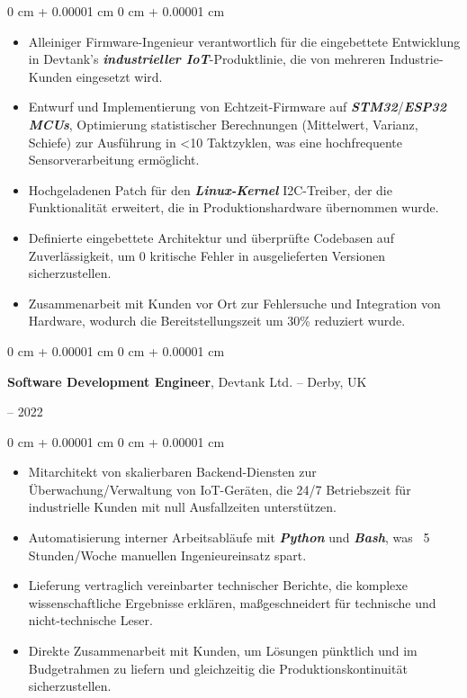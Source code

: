 \documentclass[10pt, letterpaper]{article}
\newenvironment{highlights}{
    \begin{itemize}[
        topsep=0.2 cm,
        parsep=0.2 cm,
        partopsep=0pt,
        itemsep=0.025 cm,
        leftmargin=0 cm + 10pt
    ]
}{
    \end{itemize}
}
\newenvironment{onecolentry}{
    \begin{adjustwidth}{
        0 cm + 0.00001 cm
    }{
        0 cm + 0.00001 cm
    }
}{
    \end{adjustwidth}
}
\newenvironment{twocolentry}[2][]{
    \onecolentry
    \def\secondColumn{#2}
    \setcolumnwidth{\fill, 4.75 cm}
    \begin{paracol}{2}
}{
    \switchcolumn \raggedleft \secondColumn
    \end{paracol}
    \endonecolentry
}
\begin{document}
        \vspace{0.10 cm}
        \begin{onecolentry}
            \begin{highlights}
            \item Alleiniger Firmware-Ingenieur verantwortlich für die eingebettete Entwicklung in Devtank’s \textbf{\textit{industrieller IoT}}-Produktlinie, die von mehreren Industrie-Kunden eingesetzt wird.
            \item Entwurf und Implementierung von Echtzeit-Firmware auf \textbf{\textit{STM32}}/\textbf{\textit{ESP32 MCUs}}, Optimierung statistischer Berechnungen (Mittelwert, Varianz, Schiefe) zur Ausführung in <10 Taktzyklen, was eine hochfrequente Sensorverarbeitung ermöglicht.
            \item Hochgeladenen Patch für den \textbf{\textit{Linux-Kernel}} I2C-Treiber, der die Funktionalität erweitert, die in Produktionshardware übernommen wurde.
            \item Definierte eingebettete Architektur und überprüfte Codebasen auf Zuverlässigkeit, um 0 kritische Fehler in ausgelieferten Versionen sicherzustellen.
            \item Zusammenarbeit mit Kunden vor Ort zur Fehlersuche und Integration von Hardware, wodurch die Bereitstellungszeit um 30\% reduziert wurde.
            \end{highlights}
        \end{onecolentry}


        \vspace{0.2 cm}

        \begin{twocolentry}{
            2020 – 2022
        }
            \textbf{Software Development Engineer}, Devtank Ltd. -- Derby, UK
        \end{twocolentry}

        \vspace{0.10 cm}
        \begin{onecolentry}
            \begin{highlights}
                \item Mitarchitekt von skalierbaren Backend-Diensten zur Überwachung/Verwaltung von IoT-Geräten, die 24/7 Betriebszeit für industrielle Kunden mit null Ausfallzeiten unterstützen.
                \item Automatisierung interner Arbeitsabläufe mit \textbf{\textit{Python}} und \textbf{\textit{Bash}}, was ~5 Stunden/Woche manuellen Ingenieureinsatz spart.
                \item Lieferung vertraglich vereinbarter technischer Berichte, die komplexe wissenschaftliche Ergebnisse erklären, maßgeschneidert für technische und nicht-technische Leser.
                \item Direkte Zusammenarbeit mit Kunden, um Lösungen pünktlich und im Budgetrahmen zu liefern und gleichzeitig die Produktionskontinuität sicherzustellen.
            \end{highlights}
        \end{onecolentry}
\end{document}
